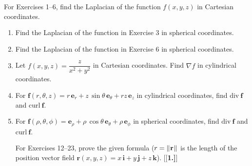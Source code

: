 \centerline{}\label{sec4dot6}
\par\noindent For Exercises 1--6, find the Laplacian of the function $f(x,y,z)$ in Cartesian coordinates.
\begin{enumerate}[\bfseries 1.]
 \item Find the Laplacian of the function in Exercise 3 in spherical coordinates.
 \item Find the Laplacian of the function in Exercise 6 in spherical coordinates.
 \item Let $f(x,y,z) = \dfrac{z}{x^2 + y^2}$ in Cartesian coordinates. Find $\nabla f$ in cylindrical coordinates.
 \item For $\mathbf{f}(r,\theta,z) = r\,\mathbf{e}_{r} + z\,\sin\theta\,\mathbf{e}_{\theta} + rz\,\mathbf{e}_{z}$ in
  cylindrical coordinates, find $\text{div}~\mathbf{f}$ and $\text{curl}~\mathbf{f}$.
 \item For $\mathbf{f}(\rho,\theta,\phi) = \mathbf{e}_{\rho} + \rho\,\cos\theta\,\mathbf{e}_{\theta} +
  \rho\,\mathbf{e}_{\phi}$ in spherical coordinates, find $\text{div}~\mathbf{f}$ and $\text{curl}~\mathbf{f}$.
\par\noindent For Exercises 12--23, prove the given formula ($r = \lVert\mspace{1mu}\mathbf{r}\mspace{1mu}\rVert$ is the length of the position
vector field $\mathbf{r}(x,y,z) = x\,\mathbf{i} + y\,\mathbf{j} +z\,\mathbf{k}$).
[{[\bfseries 1.]}]

\end{enumerate}
